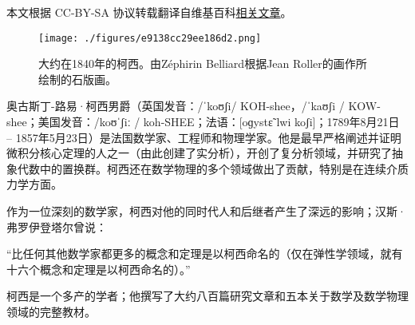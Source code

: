 
本文根据 CC-BY-SA 协议转载翻译自维基百科\href{https://en.wikipedia.org/wiki/Pierre-Simon_Laplace}{相关文章}。

\begin{figure}[ht]
\centering
\texttt{[image: ./figures/e9138cc29ee186d2.png]}
\caption{大约在1840年的柯西。由Zéphirin Belliard根据Jean Roller的画作所绘制的石版画。} \label{fig_August_1}
\end{figure}
奥古斯丁-路易·柯西男爵（英国发音：/ˈkoʊʃi/ KOH-shee，/ˈkaʊʃi / KOW-shee；美国发音：/koʊˈʃiː / koh-SHEE；法语：[oɡystɛ̃ lwi koʃi]；1789年8月21日 – 1857年5月23日）是法国数学家、工程师和物理学家。他是最早严格阐述并证明微积分核心定理的人之一（由此创建了实分析），开创了复分析领域，并研究了抽象代数中的置换群。柯西还在数学物理的多个领域做出了贡献，特别是在连续介质力学方面。

作为一位深刻的数学家，柯西对他的同时代人和后继者产生了深远的影响；汉斯·弗罗伊登塔尔曾说：

“比任何其他数学家都更多的概念和定理是以柯西命名的（仅在弹性学领域，就有十六个概念和定理是以柯西命名的）。”

柯西是一个多产的学者；他撰写了大约八百篇研究文章和五本关于数学及数学物理领域的完整教材。


